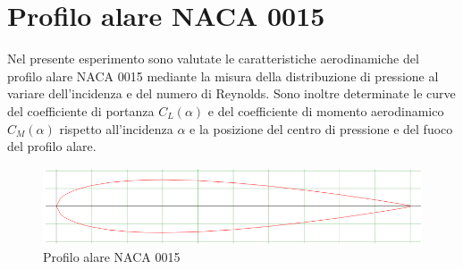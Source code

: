\section{Profilo alare NACA 0015}
Nel presente esperimento sono valutate le caratteristiche aerodinamiche del profilo alare NACA 0015 mediante la misura della distribuzione di pressione al variare dell'incidenza e del numero di Reynolds. Sono inoltre determinate le curve del coefficiente di portanza $C_L(\alpha)$ e del coefficiente di momento aerodinamico $C_M(\alpha)$ rispetto all'incidenza $\alpha$ e la posizione del centro di pressione e del fuoco del profilo alare.
\begin{figure}[H]
    \centering
    \includegraphics[width=\textwidth]{images/5/naca0015airfoiltools.png}
    \caption{Profilo alare NACA 0015}
\end{figure}

